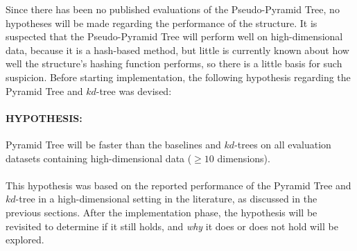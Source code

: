 Since there has been no published evaluations of the Pseudo-Pyramid Tree, no hypotheses will be made regarding the performance of the structure. It is suspected that the Pseudo-Pyramid Tree will perform well on high-dimensional data, because it is a hash-based method, but little is currently known about how well the structure's hashing function performs, so there is a little basis for such suspicion. Before starting implementation, the following hypothesis regarding the Pyramid Tree and $kd$-tree was devised:

\paragraph{\textbf{HYPOTHESIS:}} Pyramid Tree will be faster than the baselines and $kd$-trees on all evaluation datasets containing high-dimensional data ($\geq 10$ dimensions).

\paragraph{}

This hypothesis was based on the reported performance of the Pyramid Tree and $kd$-tree in a high-dimensional setting in the literature, as discussed in the previous sections. After the implementation phase, the hypothesis will be revisited to determine if it still holds, and \textit{why} it does or does not hold will be explored.